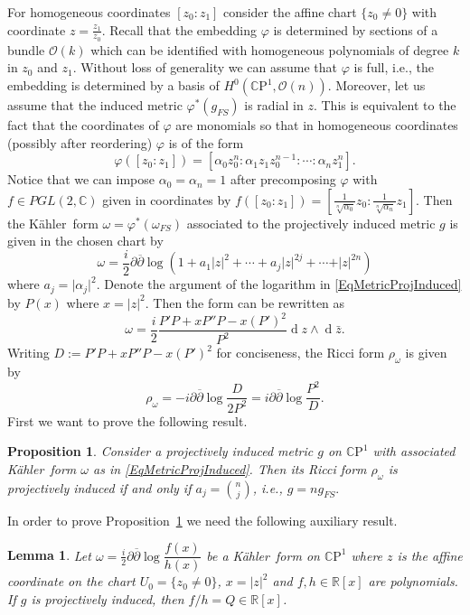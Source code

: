 \documentclass[12pt]{amsart}
\newcommand{\R}{\mathbb{R}}
\newcommand{\CP}{\mathbb{C}\mathrm{P}}
\newcommand{\C}{\mathbb{C}}
\newcommand{\de}{\partial}
\newcommand{\K}{K\"{a}hler}
\newcommand{\ov}[1]{\overline{#1}}
\newcommand{\deb}{\ov\partial}
\newcommand{\di}{{\operatorname{d}}}
\newcommand{\OO}{{\mathcal{O}}}
\newtheorem{prop}{Proposition}
\newtheorem{lem}[theor]{Lemma}
\begin{document}
For homogeneous coordinates $[z_0:z_1]$ consider the affine chart $\{z_0\neq0\}$ with coordinate $z=\frac{z_1}{z_0}$. 
Recall that the embedding $\varphi$ is determined by sections of a bundle $\OO(k)$ which can be identified with homogeneous polynomials of degree $k$ in $z_0$ and $z_1$. 
Without loss of generality we can assume that $\varphi$ is full, i.e., the embedding is determined by a basis of $H^0(\CP^1,\OO(n))$.
Moreover, let us assume that the induced metric $\varphi^*(g_{FS})$ is radial in  $z$.
This is equivalent to the fact that the coordinates of $\varphi$ are monomials so that in homogeneous coordinates (possibly after reordering) $\varphi$ is of the form
$$\varphi([z_0:z_1])=[\alpha_0z_0^n:\alpha_1z_1z_0^{n-1}:\cdots:\alpha_nz_1^n].$$
Notice that we can impose $\alpha_0=\alpha_n=1$ after precomposing $\varphi$ with $f\in PGL(2,\C)$ given in coordinates by $f([z_0:z_1])=\left[\frac{1}{\sqrt[n]{\alpha_0}}z_0:\frac{1}{\sqrt[n]{\alpha_n}}z_1\right]$.
Then the \K\ form $\omega=\varphi^*(\omega_{FS})$ associated to the projectively induced metric $g$ is given in the chosen chart by
\begin{equation}\label{EqMetricProjInduced}
	\omega=\dfrac{i}{2}\de\deb\log(1+a_1\vert z\vert^2+\cdots+a_j\vert z\vert^{2j}+\cdots+\vert z\vert^{2n})
\end{equation}
where $a_j=\vert\alpha_j\vert^2$.
Denote the argument of the logarithm in \eqref{EqMetricProjInduced} by $P\left(x\right)$ where $x=\vert z\vert^2$.
Then the form can be rewritten as 
\begin{equation}\label{EqMetricProjInduced2}
	\omega=\dfrac{i}{2}\dfrac{P'P+xP''P-x(P')^2}{P^2}\di z\wedge\di \bar z.
\end{equation}
Writing $D:=P'P+xP''P-x(P')^2$ for conciseness, the Ricci form $\rho_\omega $ is given by
\begin{equation}\label{EqRicci1}
	\rho_\omega =-i\de\deb\log\dfrac{D}{2P^2}=i\de\deb\log\dfrac{P^2}{D}.
\end{equation}
First we want to prove the following result.
\begin{prop}\label{PropProjIndCP1}
	Consider a projectively induced metric $g$ on $\CP^1$ with associated \K\ form $\omega$ as in \eqref{EqMetricProjInduced}. Then its Ricci form $\rho_\omega  $ is projectively induced if and only if $a_j={{n}\choose {j}}$, i.e.,  $g=ng_{FS}.$ 
\end{prop}
In order to prove Proposition~\ref{PropProjIndCP1} we need the following auxiliary result.
\begin{lem}\label{LemProjIndCP1}
	Let $\omega=\frac{i}{2}\de\deb\log\dfrac{f(x)}{h(x)}$ be a \K\ form on $\CP^1$ where $z$ is the affine coordinate on the chart $U_0=\{z_0\neq0\}$, $x=\vert z\vert^2$ and $f,h\in\R[x]$ are polynomials.
	If $g$ is projectively induced, then $f/h=Q\in\R[x]$.
\end{lem}
\end{document}
